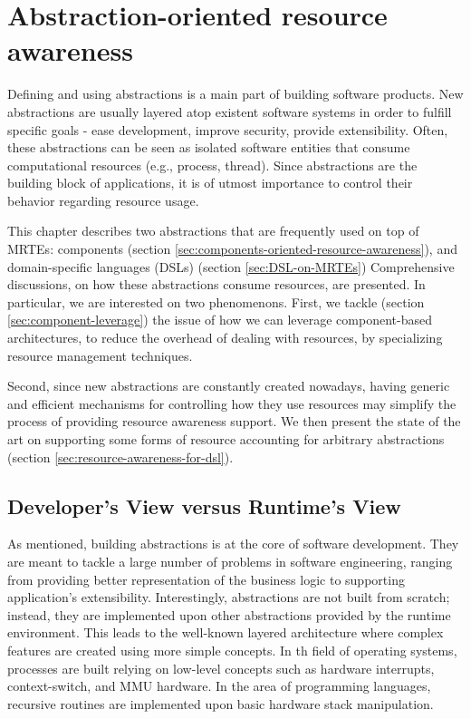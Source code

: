 \chapter{Abstraction-oriented resource awareness}
\label{chap:abstractions_and_resource_management}


Defining and using abstractions is a main part of building software products.
New abstractions are usually layered atop existent software systems in order to fulfill specific goals
- ease development, improve security, provide extensibility.
Often, these abstractions can be seen as isolated software entities that consume computational resources (e.g., process, thread).
Since abstractions are the building block of applications, it is of utmost importance to control their behavior regarding resource usage.
  
This chapter describes two abstractions that are frequently used on top of MRTEs: components (section \ref{sec:components-oriented-resource-awareness}), and domain-specific languages (DSLs) (section \ref{sec:DSL-on-MRTEs})
Comprehensive discussions, on how these abstractions consume resources, are presented.
In particular, we are interested on two phenomenons.
First, we tackle (section \ref{sec:component-leverage}) the issue of how we can leverage component-based architectures, to reduce the overhead of dealing with resources, by specializing resource management techniques.

Second, since new abstractions are constantly created nowadays, having generic and efficient mechanisms for controlling how they use resources may simplify the process of providing resource awareness support.
We then present the state of the art on supporting some forms of resource accounting for arbitrary abstractions (section \ref{sec:resource-awareness-for-dsl}).

\section{Developer's View versus Runtime's View} \label{sec:chapter2-introduction}

As mentioned, building abstractions is at the core of software development.
They are meant to tackle a large number of problems in software engineering, ranging from providing better representation of the business logic to supporting application's extensibility.
Interestingly, abstractions are not built from scratch; instead, they are implemented upon other abstractions provided by the runtime environment.
This leads to the well-known layered architecture where complex features are created using more simple concepts.
In th field of operating systems, processes are built relying on low-level concepts such as hardware interrupts, context-switch, and MMU hardware.
In the area of programming languages, recursive routines are implemented upon basic hardware stack manipulation.

